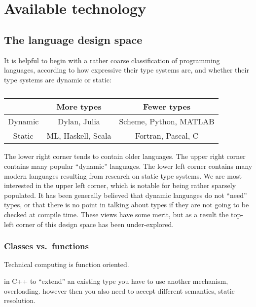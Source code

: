 \chapter{Available technology}

\section{The language design space}


It is helpful to begin with a rather coarse classification of programming
languages, according to how expressive their type systems are, and whether
their type systems are dynamic or static:

\vspace{3ex}

\begin{table}
\begin{tabular}{|c||c|c|}
\hline 
 & More types & Fewer types\tabularnewline
\hline 
\hline 
Dynamic & Dylan, Julia & Scheme, Python, MATLAB\tabularnewline
\hline 
Static & ML, Haskell, Scala & Fortran, Pascal, C\tabularnewline
\hline 
\end{tabular}
\caption[A coarse classification of languages]{}
\label{languageclass}
\end{table}

\vspace{3ex}

The lower right corner tends to contain older languages.
The upper right corner contains many popular ``dynamic'' languages.
The lower left corner contains many modern languages resulting from research
on static type systems.
We are most interested in the upper left corner, which is notable for being
rather sparsely populated.
It has been generally believed that dynamic languages do not ``need'' types,
or that there is no point in talking about types if they are not going to be
checked at compile time.
These views have some merit, but as a result the top-left corner of this design
space has been under-explored.

\subsection{Classes vs.\ functions}

Technical computing is function oriented.

in C++ to ``extend'' an existing type you have to use another mechanism,
overloading.
however then you also need to accept different semantics, static resolution.


